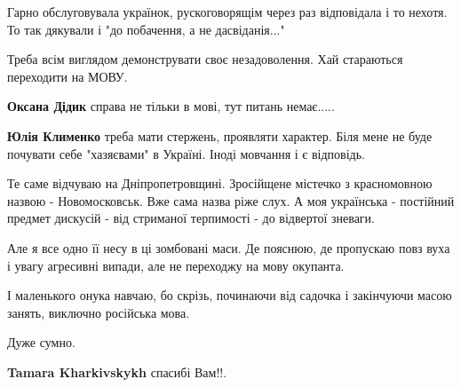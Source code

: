 \begin{itemize}
\begin{itemize}
Гарно обслуговувала українок, рускоговорящім через раз відповідала і то нехотя.
То так дякували і "до побачення, а не дасвіданія..."

Треба всім виглядом демонструвати своє незадоволення. Хай стараються переходити
на МОВУ.


 
\textbf{Оксана Дідик} справа не тільки в мові, тут питань немає.....

 
\textbf{Юлія Клименко} треба мати стержень, проявляти характер. Біля мене не буде почувати себе "хазяєвами" в Україні.
Іноді мовчання і є відповідь.
\end{itemize}

 

Те саме відчуваю на Дніпропетровщині. Зросійщене містечко з красномовною назвою
- Новомосковськ. Вже сама назва ріже слух. А моя українська - постійний предмет
дискусій - від стриманої терпимості - до відвертої зневаги.

Але я все одно її несу в ці зомбовані маси. Де пояснюю, де пропускаю повз вуха
і увагу агресивні випади, але не переходжу на мову окупанта.

І маленького онука навчаю, бо скрізь, починаючи від садочка і закінчуючи масою
занять, виключно російська мова.

Дуже сумно.

\begin{itemize}
 
\textbf{Tamara Kharkivskykh} спасибі Вам!!.


\end{itemize}
\end{itemize}
